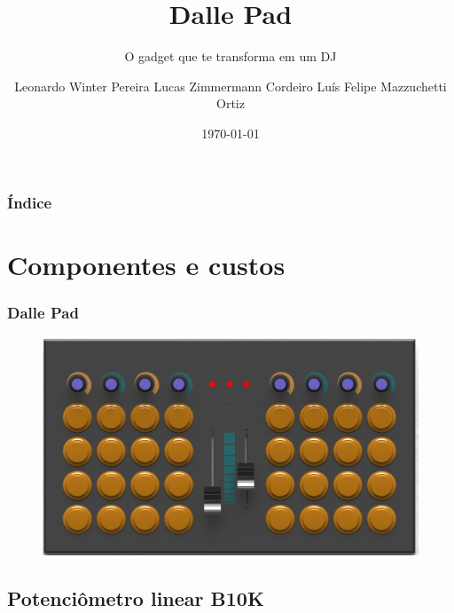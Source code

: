 \documentclass[hyperref={pdfpagelabels=false}]{beamer}
\title{Dalle Pad}
\subtitle{O gadget que te transforma em um DJ}
\author{Leonardo Winter Pereira \newline Lucas Zimmermann Cordeiro \newline Luís Felipe Mazzuchetti Ortiz}
\date{\today}
\begin{document}
    \begin{frame}
        \titlepage
    \end{frame}

    \begin{frame}\frametitle{Índice}
        \tableofcontents
    \end{frame}

    \section{Componentes e custos}

        \begin{frame}\frametitle{Dalle Pad}

            \begin{figure}
                    \includegraphics[scale=0.22]{Imagens/SW_Images/dalle_pad_montado2.png}
            \end{figure}

        \end{frame}

        \subsection{Potenciômetro linear B10K}
\end{document}
